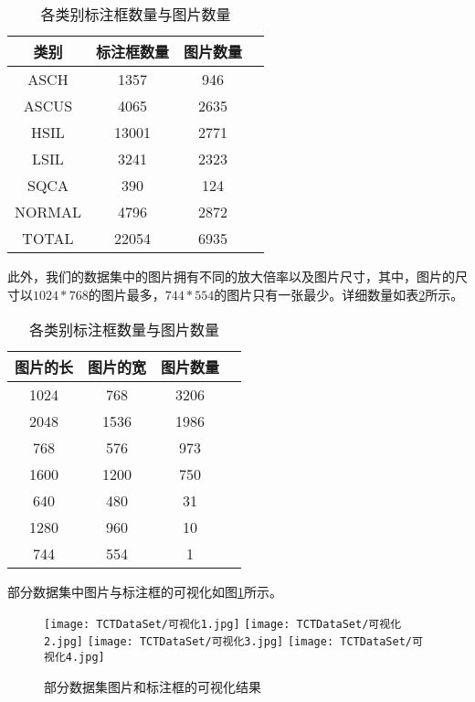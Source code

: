 \begin{table}[htbp]
    \center
    \caption{各类别标注框数量与图片数量}
    \begin{tabular}{cccc}
        \hline
        类别   & 标注框数量 & 图片数量 \\
        \hline
        ASCH   & 1357       & 946      \\
        ASCUS  & 4065       & 2635     \\
        HSIL   & 13001      & 2771     \\
        LSIL   & 3241       & 2323     \\
        SQCA   & 390        & 124      \\
        NORMAL & 4796       & 2872     \\
        TOTAL  & 22054      & 6935     \\
        \hline
    \end{tabular}
    \label{tab:类别}
\end{table}

\par 此外，我们的数据集中的图片拥有不同的放大倍率以及图片尺寸，其中，图片的尺寸以$1024*768$的图片最多，$744*554$的图片只有一张最少。详细数量如表\ref{tab:尺寸}所示。

\begin{table}[htbp]
    \center
    \caption{各类别标注框数量与图片数量}
    \begin{tabular}{cccc}
        \hline
        图片的长 & 图片的宽 & 图片数量 \\
        \hline
        1024     & 768      & 3206     \\
        2048     & 1536     & 1986     \\
        768      & 576      & 973      \\
        1600     & 1200     & 750      \\
        640      & 480      & 31       \\
        1280     & 960      & 10       \\
        744      & 554      & 1        \\
        \hline
    \end{tabular}
    \label{tab:尺寸}
\end{table}

部分数据集中图片与标注框的可视化如图\ref{pic:数据集可视化}所示。
\begin{figure}[htb]
    \centering
    \texttt{[image: TCTDataSet/可视化1.jpg]}
    \texttt{[image: TCTDataSet/可视化2.jpg]}
    \texttt{[image: TCTDataSet/可视化3.jpg]}
    \texttt{[image: TCTDataSet/可视化4.jpg]}
    \caption{部分数据集图片和标注框的可视化结果}
    \label{pic:数据集可视化}
\end{figure}

